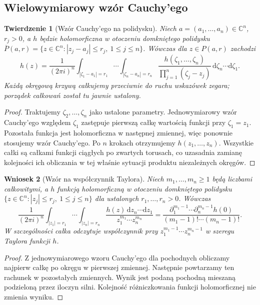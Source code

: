 \documentclass[11pt,a4paper,openany]{report}
\numberwithin{equation}{section}
\theoremstyle{plain}
\newtheorem{twierdzenie}{Twierdzenie}[section]
\newtheorem{wniosek}[twierdzenie]{Wniosek}
\theoremstyle{definition}
\theoremstyle{remark}
\newcommand{\C}{\mathbb C}
\begin{document}
\subsection{Wielowymiarowy wzór Cauchy'ego}
\label{subsec:ga4-cauchy-product}

\begin{twierdzenie}[Wzór Cauchy'ego na polidysku]
\label{tw:ga4-polydisc-cauchy}
Niech $a=(a_1,\ldots,a_n)\in\C^n$, $r_j>0$, a $h$ będzie
holomorficzna w otoczeniu domkniętego polidysku
$\overline P(a,r)=\{z\in\C^n:|z_j-a_j|\le r_j,\ 1\le j\le n\}$.
Wówczas dla $z\in P(a,r)$ zachodzi
\[
 h(z)=\frac{1}{(2\pi i)^n}
 \int_{|\zeta_1-a_1|=r_1}\!\cdots
 \int_{|\zeta_n-a_n|=r_n}
 \frac{h(\zeta_1,\ldots,\zeta_n)}
 {\prod_{j=1}^n(\zeta_j-z_j)}
 \,\mathrm d\zeta_n\cdots\mathrm d\zeta_1.
\]
Każdą okręgową krzywą całkujemy przeciwnie do ruchu wskazówek
zegara; porządek całkowań został tu jawnie ustalony.
\end{twierdzenie}
\begin{proof}
Traktujemy $\zeta_2,\ldots,\zeta_n$ jako ustalone parametry.
Jednowymiarowy wzór Cauchy'ego względem $\zeta_1$ zastępuje
pierwszą całkę wartością funkcji przy $\zeta_1=z_1$.
Pozostała funkcja jest holomorficzna w następnej zmiennej,
więc ponownie stosujemy wzór Cauchy'ego. Po $n$ krokach
otrzymujemy $h(z_1,\ldots,z_n)$.
Wszystkie całki są całkami funkcji ciągłych po zwartych torusach,
co uzasadnia zamianę kolejności ich obliczania w tej właśnie
sytuacji produktu niezależnych okręgów.
\end{proof}

\begin{wniosek}[Wzór na współczynnik Taylora]
\label{wn:ga4-monomial-res}
Niech $m_1,\ldots,m_n\ge1$ będą liczbami całkowitymi,
a $h$ funkcją holomorficzną w otoczeniu domkniętego
polidysku $\{z\in\C^n:|z_j|\le r_j,\ 1\le j\le n\}$
dla ustalonych $r_1,\ldots,r_n>0$. Wówczas
\[
\frac{1}{(2\pi i)^n}\int_{|z_1|=r_1}\!\cdots
\int_{|z_n|=r_n}
\frac{h(z)\,\mathrm dz_n\cdots\mathrm dz_1}
{z_1^{m_1}\cdots z_n^{m_n}}
=\frac{\partial_1^{m_1-1}\cdots\partial_n^{m_n-1}h(0)}
{(m_1-1)!\cdots(m_n-1)!}.
\]
W szczególności całka odczytuje współczynnik przy
$z_1^{m_1-1}\cdots z_n^{m_n-1}$ w szeregu Taylora funkcji $h$.
\end{wniosek}
\begin{proof}
Z jednowymiarowego wzoru Cauchy'ego dla pochodnych
obliczamy najpierw całkę po okręgu w pierwszej zmiennej.
Następnie powtarzamy ten rachunek w pozostałych zmiennych.
Wynik jest podaną pochodną mieszaną podzieloną przez
iloczyn silni. Kolejność różniczkowania funkcji
holomorficznej nie zmienia wyniku.
\end{proof}
\end{document}
